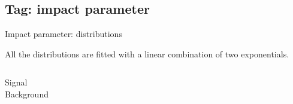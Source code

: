 \subsection{Tag: impact parameter}

\begin{frame}{Impact parameter: distributions}

	\begin{block}{}
		All the distributions are fitted with a linear combination of two exponentials.
	\end{block}
	
	\begin{columns}
			\centering
			Signal\\
			\centering
			Background\\
	\end{columns}
\end{frame}
